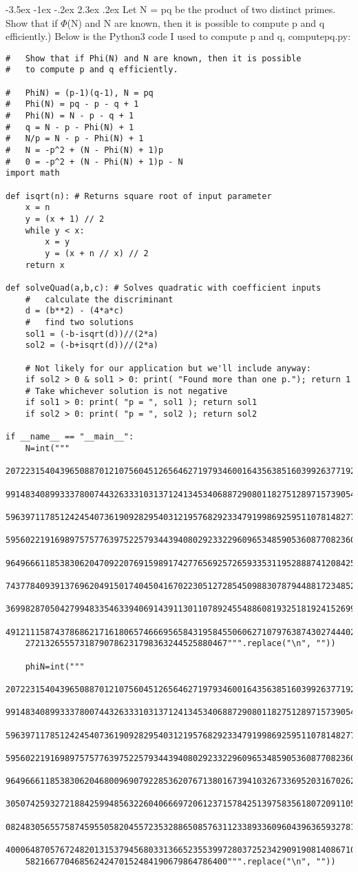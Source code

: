 \documentclass{article}
\makeatletter
\renewcommand\section{\@startsection{section}{1}{\z@}%
                                   {-3.5ex \@plus -1ex \@minus -.2ex}%
                                   {2.3ex \@plus.2ex}%
                                   {\normalfont\large\bfseries}}
\makeatother
\begin{document}
\section{Let N = pq be the product of two distinct primes. Show that if $\Phi$(N) and N are known, then it is 		possible to compute p and q efficiently.)}
		Below is the Python3 code I used to compute p and q, computepq.py:
		\begin{framed}
		\begin{verbatim} 
#   Show that if Phi(N) and N are known, then it is possible
#   to compute p and q efficiently.

#   PhiN) = (p-1)(q-1), N = pq
#   Phi(N) = pq - p - q + 1
#   Phi(N) = N - p - q + 1
#   q = N - p - Phi(N) + 1
#   N/p = N - p - Phi(N) + 1
#   N = -p^2 + (N - Phi(N) + 1)p
#   0 = -p^2 + (N - Phi(N) + 1)p - N
import math

def isqrt(n): # Returns square root of input parameter
    x = n
    y = (x + 1) // 2
    while y < x:
        x = y
        y = (x + n // x) // 2
    return x

def solveQuad(a,b,c): # Solves quadratic with coefficient inputs
    #   calculate the discriminant
    d = (b**2) - (4*a*c)
    #   find two solutions
    sol1 = (-b-isqrt(d))//(2*a)
    sol2 = (-b+isqrt(d))//(2*a)

    # Not likely for our application but we'll include anyway:
    if sol2 > 0 & sol1 > 0: print( "Found more than one p."); return 1
    # Take whichever solution is not negative
    if sol1 > 0: print( "p = ", sol1 ); return sol1
    if sol2 > 0: print( "p = ", sol2 ); return sol2

if __name__ == "__main__":
    N=int("""
    207223154043965088701210756045126564627197934600164356385160399263771929
    991483408993337800744326333103137124134534068872908011827512897157390544
    596397117851242454073619092829540312195768292334791998692595110781482773
    595602219169897575776397522579344394080292332296096534859053608770823602
    964966611853830620470922076915989174277656925726593353119528887412084256
    743778409391376962049150174045041670223051272854509883078794488172348520
    369982870504279948335463394069143911301107892455488608193251819241526996
    491211158743786862171618065746669565843195845506062710797638743027444024
    27213265557318790786231798363244525880467""".replace("\n", ""))

    phiN=int("""
    207223154043965088701210756045126564627197934600164356385160399263771929
    991483408993337800744326333103137124134534068872908011827512897157390544
    596397117851242454073619092829540312195768292334791998692595110781482773
    595602219169897575776397522579344394080292332296096534859053608770823602
    964966611853830620468009690792285362076713801673941032673369520316702623
    305074259327218842599485632260406669720612371578425139758356180720911055
    082483056557587459550582045572353288650857631123389336096043963659327817
    400064870576724820131537945680331366523553997280372523429091908140867101
    58216677046856242470152484190679864786400""".replace("\n", ""))


\end{verbatim}
\end{framed}
\end{document}
